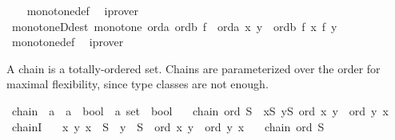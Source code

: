 \begin{isabellebody}
%
\isadelimproof
\ \ %
\endisadelimproof
%
\isatagproof
{}\isamarkupfalse%
\ monotone{\isacharunderscore}{\kern0pt}def\ \isamarkupfalse%
\ iprover%
\endisatagproof
{\isafoldproof}%
%
\isadelimproof
\isanewline
%
\endisadelimproof
\isanewline
{}\isamarkupfalse%
\ monotoneD{\isacharbrackleft}{\kern0pt}dest{\isacharquery}{\kern0pt}{\isacharbrackright}{\kern0pt}{\isacharcolon}{\kern0pt}\ {\isachardoublequoteopen}monotone\ orda\ ordb\ f\ {\isasymLongrightarrow}\ orda\ x\ y\ {\isasymLongrightarrow}\ ordb\ {\isacharparenleft}{\kern0pt}f\ x{\isacharparenright}{\kern0pt}\ {\isacharparenleft}{\kern0pt}f\ y{\isacharparenright}{\kern0pt}{\isachardoublequoteclose}\isanewline
%
\isadelimproof
\ \ %
\endisadelimproof
%
\isatagproof
{}\isamarkupfalse%
\ monotone{\isacharunderscore}{\kern0pt}def\ \isamarkupfalse%
\ iprover%
\endisatagproof
{\isafoldproof}%
%
\isadelimproof
%
\endisadelimproof
%
\isadelimdocument
%
\endisadelimdocument
%
\isatagdocument
%
\isamarkuptrue%
%
\endisatagdocument
{\isafolddocument}%
%
\isadelimdocument
%
\endisadelimdocument
%
\begin{isamarkuptext}%
A chain is a totally-ordered set. Chains are parameterized over
  the order for maximal flexibility, since type classes are not enough.%
\end{isamarkuptext}\isamarkuptrue%
\isamarkupfalse%
\ chain\ {\isacharcolon}{\kern0pt}{\isacharcolon}{\kern0pt}\ {\isachardoublequoteopen}{\isacharparenleft}{\kern0pt}{\isacharprime}{\kern0pt}a\ {\isasymRightarrow}\ {\isacharprime}{\kern0pt}a\ {\isasymRightarrow}\ bool{\isacharparenright}{\kern0pt}\ {\isasymRightarrow}\ {\isacharprime}{\kern0pt}a\ set\ {\isasymRightarrow}\ bool{\isachardoublequoteclose}\isanewline
\ \ \ {\isachardoublequoteopen}chain\ ord\ S\ {\isasymlongleftrightarrow}\ {\isacharparenleft}{\kern0pt}{\isasymforall}x{\isasymin}S{\isachardot}{\kern0pt}\ {\isasymforall}y{\isasymin}S{\isachardot}{\kern0pt}\ ord\ x\ y\ {\isasymor}\ ord\ y\ x{\isacharparenright}{\kern0pt}{\isachardoublequoteclose}\isanewline
\isanewline
{}\isamarkupfalse%
\ chainI{\isacharcolon}{\kern0pt}\isanewline
\ \ \ {\isachardoublequoteopen}{\isasymAnd}x\ y{\isachardot}{\kern0pt}\ x\ {\isasymin}\ S\ {\isasymLongrightarrow}\ y\ {\isasymin}\ S\ {\isasymLongrightarrow}\ ord\ x\ y\ {\isasymor}\ ord\ y\ x{\isachardoublequoteclose}\isanewline
\ \ \ {\isachardoublequoteopen}chain\ ord\ S{\isachardoublequoteclose}\isanewline

\end{isabellebody}
